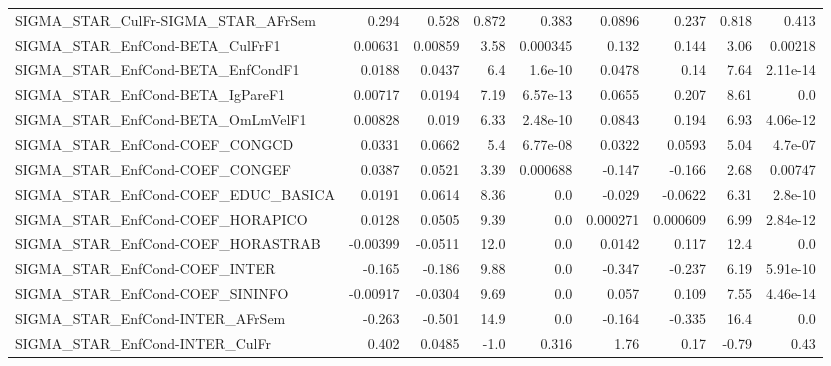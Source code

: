 \begin{tabular}{lrrrrrrrr}
SIGMA\_STAR\_CulFr-SIGMA\_STAR\_AFrSem    &       0.294 &        0.528 &   0.872 &    0.383 &     0.0896 &       0.237 &        0.818 &         0.413 \\
SIGMA\_STAR\_EnfCond-BETA\_CulFrF1       &     0.00631 &      0.00859 &    3.58 & 0.000345 &      0.132 &       0.144 &         3.06 &       0.00218 \\
SIGMA\_STAR\_EnfCond-BETA\_EnfCondF1     &      0.0188 &       0.0437 &     6.4 &  1.6e-10 &     0.0478 &        0.14 &         7.64 &      2.11e-14 \\
SIGMA\_STAR\_EnfCond-BETA\_IgPareF1      &     0.00717 &       0.0194 &    7.19 & 6.57e-13 &     0.0655 &       0.207 &         8.61 &           0.0 \\
SIGMA\_STAR\_EnfCond-BETA\_OmLmVelF1     &     0.00828 &        0.019 &    6.33 & 2.48e-10 &     0.0843 &       0.194 &         6.93 &      4.06e-12 \\
SIGMA\_STAR\_EnfCond-COEF\_CONGCD        &      0.0331 &       0.0662 &     5.4 & 6.77e-08 &     0.0322 &      0.0593 &         5.04 &       4.7e-07 \\
SIGMA\_STAR\_EnfCond-COEF\_CONGEF        &      0.0387 &       0.0521 &    3.39 & 0.000688 &     -0.147 &      -0.166 &         2.68 &       0.00747 \\
SIGMA\_STAR\_EnfCond-COEF\_EDUC\_BASICA   &      0.0191 &       0.0614 &    8.36 &      0.0 &     -0.029 &     -0.0622 &         6.31 &       2.8e-10 \\
SIGMA\_STAR\_EnfCond-COEF\_HORAPICO      &      0.0128 &       0.0505 &    9.39 &      0.0 &   0.000271 &    0.000609 &         6.99 &      2.84e-12 \\
SIGMA\_STAR\_EnfCond-COEF\_HORASTRAB     &    -0.00399 &      -0.0511 &    12.0 &      0.0 &     0.0142 &       0.117 &         12.4 &           0.0 \\
SIGMA\_STAR\_EnfCond-COEF\_INTER         &      -0.165 &       -0.186 &    9.88 &      0.0 &     -0.347 &      -0.237 &         6.19 &      5.91e-10 \\
SIGMA\_STAR\_EnfCond-COEF\_SININFO       &    -0.00917 &      -0.0304 &    9.69 &      0.0 &      0.057 &       0.109 &         7.55 &      4.46e-14 \\
SIGMA\_STAR\_EnfCond-INTER\_AFrSem       &      -0.263 &       -0.501 &    14.9 &      0.0 &     -0.164 &      -0.335 &         16.4 &           0.0 \\
SIGMA\_STAR\_EnfCond-INTER\_CulFr        &       0.402 &       0.0485 &    -1.0 &    0.316 &       1.76 &        0.17 &        -0.79 &          0.43 \\

\end{tabular}
